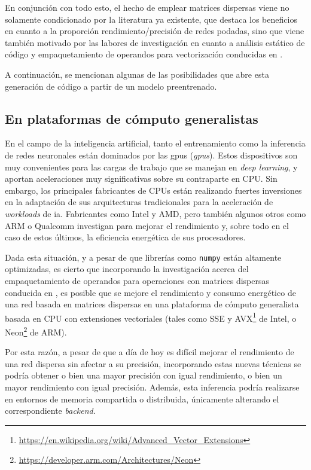 En conjunción con todo esto, el hecho de emplear matrices dispersas viene no solamente condicionado por la literatura ya existente, que destaca los beneficios en cuanto a la proporción rendimiento/precisión de redes podadas, sino que viene también motivado por las labores de investigación en cuanto a análisis estático de código y empaquetamiento de operandos para vectorización conducidas en \cite{custom_high_performance_vector_codegen_sparse_computations}.

A continuación, se mencionan algunas de las posibilidades que abre esta generación de código a partir de un modelo preentrenado.

\subsection{En plataformas de cómputo generalistas}
\label{ssec:posibilidades_en_computo_generalistas}
En el campo de la inteligencia artificial, tanto el entrenamiento como la inferencia de redes neuronales están dominados por las \acrshort{gpu}s (\textit{\acrlong{gpu}s}). Estos dispositivos son muy convenientes para las cargas de trabajo que se manejan en \textit{deep learning}, y aportan aceleraciones muy significativas sobre su contraparte en CPU. Sin embargo, los principales fabricantes de CPUs están realizando fuertes inversiones en la adaptación de sus arquitecturas tradicionales para la aceleración de \textit{workloads} de \acrshort{ia}. Fabricantes como Intel y AMD, pero también algunos otros como ARM o Qualcomm investigan para mejorar el rendimiento y, sobre todo en el caso de estos últimos, la eficiencia energética de sus procesadores.

Dada esta situación, y a pesar de que librerías como \texttt{numpy} están altamente optimizadas, es cierto que incorporando la investigación acerca del empaquetamiento de operandos para operaciones con matrices dispersas conducida en \cite{custom_high_performance_vector_codegen_sparse_computations}, es posible que se mejore el rendimiento y consumo energético de una red basada en matrices dispersas en una plataforma de cómputo generalista basada en CPU con extensiones vectoriales (tales como SSE y AVX\footnote{\url{https://en.wikipedia.org/wiki/Advanced\_Vector\_Extensions}} de Intel, o Neon\footnote{\url{https://developer.arm.com/Architectures/Neon}} de ARM).

Por esta razón, a pesar de que a día de hoy es difícil mejorar el rendimiento de una red dispersa sin afectar a su precisión, incorporando estas nuevas técnicas se podría obtener o bien una mayor precisión con igual rendimiento, o bien un mayor rendimiento con igual precisión. Además, esta inferencia podría realizarse en entornos de memoria compartida o distribuida, únicamente alterando el correspondiente \textit{backend}.


